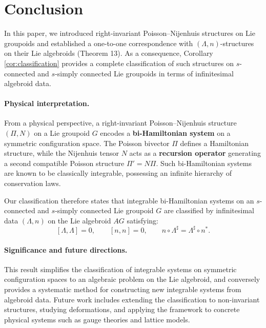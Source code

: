 \documentclass{article}
\begin{document}
\section{Conclusion}

In this paper, we introduced right-invariant Poisson–Nijenhuis structures on Lie groupoids and established a one-to-one correspondence with $(\Lambda, n)$-structures on their Lie algebroids (Theorem 13). As a consequence, Corollary \ref{cor:classification} provides a complete classification of such structures on $s$-connected and $s$-simply connected Lie groupoids in terms of infinitesimal algebroid data.

\paragraph{Physical interpretation.}
From a physical perspective, a right-invariant Poisson–Nijenhuis structure $(\Pi, N)$ on a Lie groupoid $G$ encodes a \textbf{bi-Hamiltonian system} on a symmetric configuration space. The Poisson bivector $\Pi$ defines a Hamiltonian structure, while the Nijenhuis tensor $N$ acts as a \textbf{recursion operator} generating a second compatible Poisson structure $\Pi' = N\Pi$. Such bi-Hamiltonian systems are known to be classically integrable, possessing an infinite hierarchy of conservation laws.

Our classification therefore states that integrable bi-Hamiltonian systems on an $s$-connected and $s$-simply connected Lie groupoid $G$ are classified by infinitesimal data $(\Lambda, n)$ on the Lie algebroid $AG$ satisfying:
\[
[\Lambda, \Lambda] = 0, \qquad [n, n] = 0, \qquad n \circ \Lambda^{\sharp} = \Lambda^{\sharp} \circ n^{*}.
\]

\paragraph{Significance and future directions.}
This result simplifies the classification of integrable systems on symmetric configuration spaces to an algebraic problem on the Lie algebroid, and conversely provides a systematic method for constructing new integrable systems from algebroid data. Future work includes extending the classification to non-invariant structures, studying deformations, and applying the framework to concrete physical systems such as gauge theories and lattice models.

\end{document}
